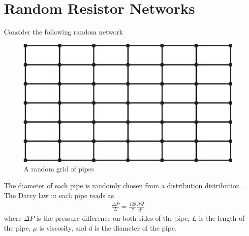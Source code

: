\section{Random Resistor Networks}
%
Consider the following random network
%
%
\begin{figure}[h]
  \centering
  \includegraphics[width=12cm]{./Figs/grid.eps}
  \caption{A random grid of pipes} \label{fig-grid}
\end{figure}
%
The diameter of each pipe is randomly chosen from a distribution
distribution. The Darcy law in each pipe reads as
%
\begin{align}
  \frac{\Delta P}{L}  = \frac{128}{\pi} \frac{\mu Q}{d^4} 
\end{align}
%
where $\Delta P$ is the pressure difference on both sides of the pipe,
$L$ is the length of the pipe, $\mu$ is viscosity, and $d$ is the
diameter of the pipe.
% 



